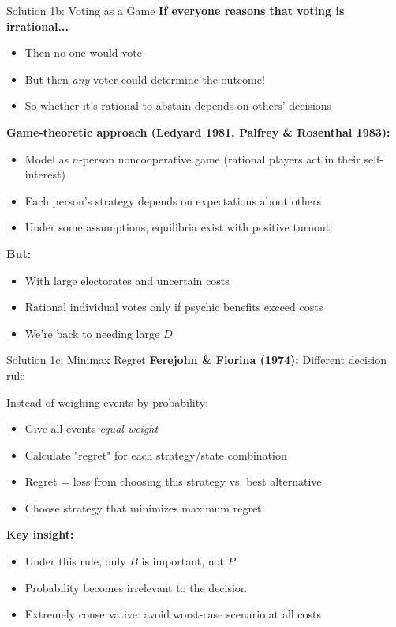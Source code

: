 \documentclass[10pt]{beamer}
\begin{document}
\begin{frame}{Solution 1b: Voting as a Game}
\textbf{If everyone reasons that voting is irrational...}
\begin{itemize}
\item Then no one would vote
\item But then \emph{any} voter could determine the outcome!
\item So whether it's rational to abstain depends on others' decisions
\end{itemize}


\textbf{Game-theoretic approach (Ledyard 1981, Palfrey \& Rosenthal 1983):}
\begin{itemize}
\item Model as $n$-person noncooperative game (rational players act in their self-interest)
\item Each person's strategy depends on expectations about others
\item Under some assumptions, equilibria exist with positive turnout
\end{itemize}


\textbf{But:}
\begin{itemize}
\item With large electorates and uncertain costs
\item Rational individual votes only if psychic benefits exceed costs
\item \alert{We're back to needing large $D$}
\end{itemize}
\end{frame}

\begin{frame}{Solution 1c: Minimax Regret}
\textbf{Ferejohn \& Fiorina (1974):} Different decision rule


Instead of weighing events by probability:
\begin{itemize}
\item Give all events \emph{equal weight}
\item Calculate "regret" for each strategy/state combination
\item Regret = loss from choosing this strategy vs. best alternative
\item Choose strategy that minimizes maximum regret
\end{itemize}


\textbf{Key insight:}
\begin{itemize}
\item Under this rule, only $B$ is important, not $P$
\item Probability becomes irrelevant to the decision
\item Extremely conservative: avoid worst-case scenario at all costs
\end{itemize}
\end{frame}
\end{document}

